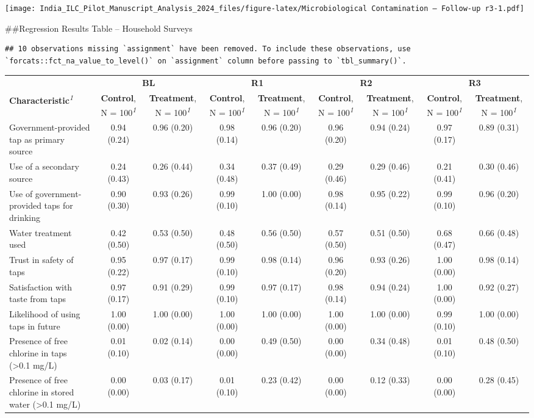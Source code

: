 \documentclass[
]{article}
\begin{document}
\texttt{[image: India\_ILC\_Pilot\_Manuscript\_Analysis\_2024\_files/figure-latex/Microbiological Contamination -- Follow-up r3-1.pdf]}

\#\#Regression Results Table -- Household Surveys

\begin{verbatim}
## 10 observations missing `assignment` have been removed. To include these observations, use `forcats::fct_na_value_to_level()` on `assignment` column before passing to `tbl_summary()`.
\end{verbatim}

\setlength{\LTpost}{0mm}
\begin{longtable}{lcccccccc}
\toprule
 & \multicolumn{2}{c}{\textbf{BL}} & \multicolumn{2}{c}{\textbf{R1}} & \multicolumn{2}{c}{\textbf{R2}} & \multicolumn{2}{c}{\textbf{R3}} \\ 
\cmidrule(lr){2-3} \cmidrule(lr){4-5} \cmidrule(lr){6-7} \cmidrule(lr){8-9}
\textbf{Characteristic}\textsuperscript{\textit{1}} & \textbf{Control}, N = 100\textsuperscript{\textit{1}} & \textbf{Treatment}, N = 100\textsuperscript{\textit{1}} & \textbf{Control}, N = 100\textsuperscript{\textit{1}} & \textbf{Treatment}, N = 100\textsuperscript{\textit{1}} & \textbf{Control}, N = 100\textsuperscript{\textit{1}} & \textbf{Treatment}, N = 100\textsuperscript{\textit{1}} & \textbf{Control}, N = 100\textsuperscript{\textit{1}} & \textbf{Treatment}, N = 100\textsuperscript{\textit{1}} \\ 
\midrule\addlinespace[2.5pt]
Government-provided tap as primary source & 0.94 (0.24) & 0.96 (0.20) & 0.98 (0.14) & 0.96 (0.20) & 0.96 (0.20) & 0.94 (0.24) & 0.97 (0.17) & 0.89 (0.31) \\ 
Use of a secondary source & 0.24 (0.43) & 0.26 (0.44) & 0.34 (0.48) & 0.37 (0.49) & 0.29 (0.46) & 0.29 (0.46) & 0.21 (0.41) & 0.30 (0.46) \\ 
Use of government-provided taps for drinking & 0.90 (0.30) & 0.93 (0.26) & 0.99 (0.10) & 1.00 (0.00) & 0.98 (0.14) & 0.95 (0.22) & 0.99 (0.10) & 0.96 (0.20) \\ 
Water treatment used & 0.42 (0.50) & 0.53 (0.50) & 0.48 (0.50) & 0.56 (0.50) & 0.57 (0.50) & 0.51 (0.50) & 0.68 (0.47) & 0.66 (0.48) \\ 
Trust in safety of taps & 0.95 (0.22) & 0.97 (0.17) & 0.99 (0.10) & 0.98 (0.14) & 0.96 (0.20) & 0.93 (0.26) & 1.00 (0.00) & 0.98 (0.14) \\ 
Satisfaction with taste from taps & 0.97 (0.17) & 0.91 (0.29) & 0.99 (0.10) & 0.97 (0.17) & 0.98 (0.14) & 0.94 (0.24) & 1.00 (0.00) & 0.92 (0.27) \\ 
Likelihood of using taps in future & 1.00 (0.00) & 1.00 (0.00) & 1.00 (0.00) & 1.00 (0.00) & 1.00 (0.00) & 1.00 (0.00) & 0.99 (0.10) & 1.00 (0.00) \\ 
Presence of free chlorine in taps (>0.1 mg/L) & 0.01 (0.10) & 0.02 (0.14) & 0.00 (0.00) & 0.49 (0.50) & 0.00 (0.00) & 0.34 (0.48) & 0.01 (0.10) & 0.48 (0.50) \\ 
Presence of free chlorine in stored water (>0.1 mg/L) & 0.00 (0.00) & 0.03 (0.17) & 0.01 (0.10) & 0.23 (0.42) & 0.00 (0.00) & 0.12 (0.33) & 0.00 (0.00) & 0.28 (0.45) \\ 
\bottomrule
\end{longtable}
\end{document}
